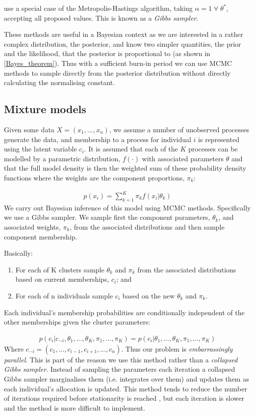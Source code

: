 \documentclass[11pt]{article} %
\begin{document}
\citet{GemanStochasticRelaxationGibbs1984} use a special case of the Metropolis-Hastings algorithm, taking $\alpha = 1 \; \forall \; \theta^*$, accepting all proposed values. This is known as a \emph{Gibbs sampler}.

These methods are useful in a Bayesian context as we are interested in a rather complex distribution, the posterior, and know two simpler quantities, the prior and the likelihood, that the posterior is proportional to (as shown in \eqref{Bayes_theorem}). Thus with a sufficient burn-in period we can use MCMC methods to sample directly from the posterior distribution without directly calculating the normalising constant.

\subsection{Mixture models} \label{mixture_models}
Given some data $X = (x_1, \ldots, x_n)$, we assume a number of unobserved processes generate the data, and membership to a process for individual $i$ is represented using the latent variable $c_i$. It is assumed that each of the $K$ processes can be modelled by a parametric distribution, $f(\cdot)$ with associated parameters $\theta$ and that the full model density is then the weighted sum of these probability density functions where the weights are the component proportions, $\pi_k$:

\begin{align}
p(x_i) = \sum_{k=1}^K \pi_k f(x_i | \theta_k)
\end{align}
We carry out Bayesian inference of this model using MCMC methods. Specifically we use a Gibbs sampler. We sample first the component parameters, $\theta_k$, and associated weights, $\pi_k$, from the associated distributions and then sample component membership.

Basically:
\begin{enumerate}
 \item For each of K clusters sample $\theta_k$ and $\pi_k$ from the associated distributions based on current memberships, $c_i$; and
 \item For each of n individuals sample $c_i$ based on the new $\theta_k$ and $\pi_k$.
\end{enumerate}
Each individual's membership probabilities are conditionally independent of the other memberships given the cluster parameters:

\begin{align}
p(c_i|c_{-i}, \theta_1,\ldots,\theta_K, \pi_1,\ldots,\pi_K) = p(c_i| \theta_1,\ldots,\theta_K, \pi_1,\ldots,\pi_K)
\end{align}
Where $c_{-i} = (c_1, \ldots, c_{i-1}, c_{i+1}, \ldots, c_n)$. Thus our problem is \emph{embarrassingly parallel}. This is part of the reason we use this method rather than a \emph{collapsed Gibbs sampler}. Instead of sampling the parameters each iteration a collapsed Gibbs sampler marginalises them (i.e. integrates over them) and updates them as each individual's allocation is updated. This method tends to reduce the number of iterations required before stationarity is reached \cite{LiuCollapsedGibbsSampler1994}, but each iteration is slower and the method is more difficult to implement.
\end{document}
